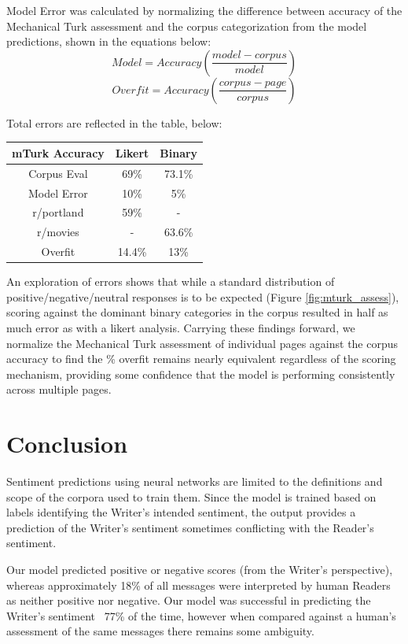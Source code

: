 \documentclass[11pt]{article}
\begin{document}
Model Error was calculated by normalizing the difference 
between accuracy of the Mechanical Turk assessment and the corpus 
categorization from the model predictions, shown in the equations below:
\[
  Model = Accuracy\left(\frac{model - corpus}{model}\right)
\]
\[
  Overfit = Accuracy\left(\frac{corpus - page}{corpus}\right)
\]

Total errors are reflected in the table, below:

\begin{center}
 \begin{tabular}{||c c c||} 
 \hline
 mTurk Accuracy & Likert  & Binary  \\ [0.5ex] 
 \hline\hline
 Corpus Eval & 69\% & 73.1\% \\ 
 \hline
 Model Error & 10\% & 5\% \\
 \hline\hline
 r/portland & 59\% & -  \\
 \hline
 r/movies & - & 63.6\%  \\
 \hline
 Overfit & 14.4\% & 13\% \\[1ex] 
 \hline\hline
\end{tabular}
\end{center}

An exploration of errors shows that while a standard distribution of 
positive/negative/neutral responses is to be expected 
(Figure \ref{fig:mturk_assess}), scoring against the dominant binary 
categories in the corpus resulted in half as 
much error as with a likert analysis. Carrying these findings 
forward, we normalize the Mechanical Turk assessment of individual 
pages against the corpus accuracy to find the \% overfit remains nearly 
equivalent regardless of the scoring mechanism, providing some 
confidence that the model is performing consistently across multiple 
pages.

\section{Conclusion}

Sentiment predictions using neural networks are limited to the definitions and scope 
of the corpora used to train them. Since the model is trained based on labels 
identifying the Writer's intended
sentiment, the output provides a prediction of the Writer's sentiment sometimes conflicting 
with the Reader's sentiment.  

Our model predicted positive or negative scores (from the Writer's perspective), whereas approximately 18\% of all messages were 
interpreted by human Readers as neither positive nor negative. Our model was successful in predicting the Writer's sentiment ~77\% of the time, however when compared against a human's assessment of the same messages there remains some ambiguity. 
\end{document}
